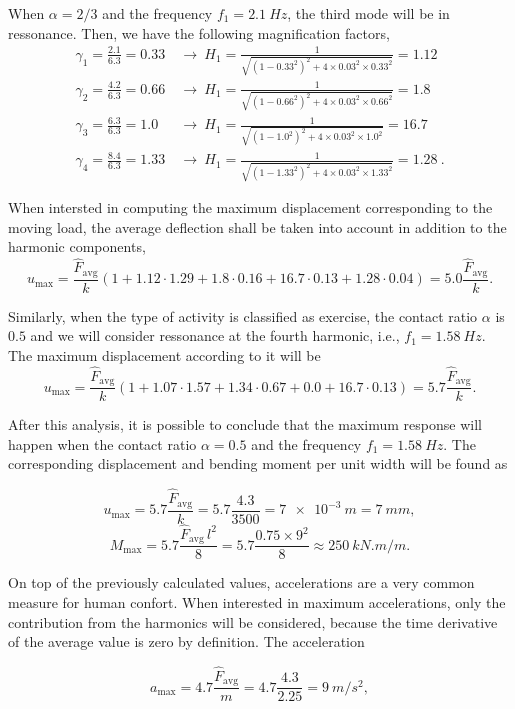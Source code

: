 \begin{Answer}[ref={footfall_analysis}]
When $\alpha=2/3$ and the frequency $f_1=\SI{2.1}{Hz}$, the third mode will be in ressonance. Then, we have the following magnification factors,
\begin{align*}
\gamma_1 = \frac{2.1}{6.3} = 0.33\ &\rightarrow\ H_1 = \frac{1}{\sqrt{(1-0.33^2)^2 + 4\times0.03^2\times0.33^2}} = 1.12\\
\gamma_2 = \frac{4.2}{6.3} = 0.66\ &\rightarrow\ H_1 = \frac{1}{\sqrt{(1-0.66^2)^2 + 4\times0.03^2\times0.66^2}} = 1.8\\
\gamma_3 = \frac{6.3}{6.3} = 1.0\ \ &\rightarrow\ H_1 = \frac{1}{\sqrt{(1-1.0^2)^2  + 4\times0.03^2\times1.0^2}}  = 16.7\\
\gamma_4 = \frac{8.4}{6.3} = 1.33\ &\rightarrow\ H_1 = \frac{1}{\sqrt{(1-1.33^2)^2 + 4\times0.03^2\times1.33^2}} = 1.28\ .
\end{align*}

When intersted in computing the maximum displacement corresponding to the moving load, the average deflection shall be taken into account in addition to the harmonic components,
$$
u_\text{max} = \frac{\hat{F}_\text{avg}}{k} (1 + 1.12\cdot1.29 + 1.8\cdot0.16 + 16.7\cdot0.13 + 1.28\cdot0.04) = 5.0\frac{\hat{F}_\text{avg}}{k}.
$$

Similarly, when the type of activity is classified as exercise, the contact ratio $\alpha$ is $0.5$ and we will consider ressonance at the fourth harmonic, i.e., $f_1=\SI{1.58}{Hz}$. The maximum displacement according to it will be
$$
u_\text{max} = \frac{\hat{F}_\text{avg}}{k} (1 + 1.07\cdot1.57 + 1.34\cdot0.67 + 0.0 + 16.7\cdot0.13) = 5.7\frac{\hat{F}_\text{avg}}{k}.
$$

After this analysis, it is possible to conclude that the maximum response will happen when the contact ratio $\alpha=0.5$ and the frequency $f_1=\SI{1.58}{Hz}$. The corresponding displacement and bending moment per unit width will be found as

$$
u_\text{max} = 5.7\frac{\hat{F}_\text{avg}}{k} = 5.7\frac{4.3}{3500} = \SI{7e-3}{m} = \SI{7}{mm},
$$
$$
M_\text{max} = 5.7\frac{\hat{F}_\text{avg}\, l^2}{8} = 5.7\frac{0.75\times9^2}{8} \approx \SI{250}{kN.m/m}.
$$

On top of the previously calculated values, accelerations are a very common measure for human confort. When interested in maximum accelerations, only the contribution from the harmonics will be considered, because the time derivative of the average value is zero by definition. The acceleration

$$
a_\text{max} = 4.7\frac{\hat{F}_\text{avg}}{m} = 4.7\frac{4.3}{2.25} = \SI{9}{m/s^2},
$$


\end{Answer}
